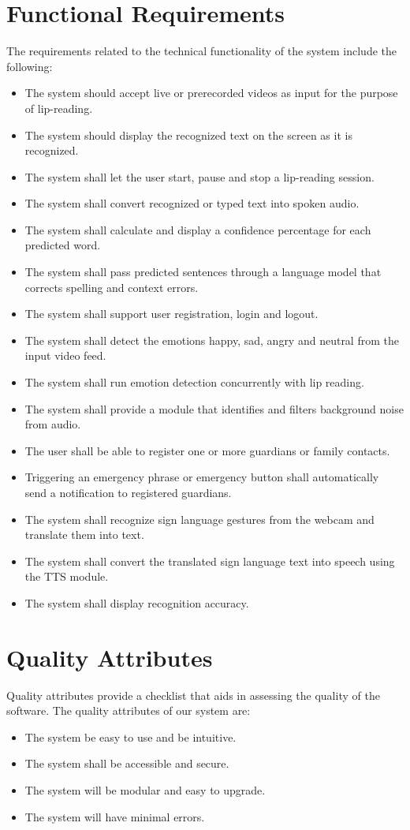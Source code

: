 \documentclass{FastFyp}
\begin{document}
\section{Functional Requirements}
The requirements related to the technical functionality of the system include the following:
\begin{itemize}
  \item The system should accept live or prerecorded videos as input for the purpose of lip-reading.
  \item The system should display the recognized text on the screen as it is recognized.
  \item The system shall let the user start, pause and stop a lip-reading session. 
  \item The system shall convert recognized or typed text into spoken audio.
  \item The system shall calculate and display a confidence percentage for each predicted word.
  \item The system shall pass predicted sentences through a language model that corrects spelling and context errors.
  \item The system shall support user registration, login and logout.
  \item The system shall detect the emotions happy, sad, angry and neutral from the input video feed.
  \item The system shall run emotion detection concurrently with lip reading.
  \item The system shall provide a module that identifies and filters background noise from audio.
  \item The user shall be able to register one or more guardians or family contacts.
  \item Triggering an emergency phrase or emergency button shall automatically send a notification to registered guardians.
  \item The system shall recognize sign language gestures from the webcam and translate them into text.
  \item The system shall convert the translated sign language text into speech using the TTS module.
  \item The system shall display recognition accuracy.
\end{itemize}

\section{Quality Attributes}
Quality attributes provide a checklist that aids in assessing the quality of the software. The quality attributes of our system are:
\begin{itemize}
  \item The system be easy to use and be intuitive.
  \item The system shall be accessible and secure.
  \item The system will be modular and easy to upgrade.
  \item The system will have minimal errors.
\end{itemize}
\end{document}
